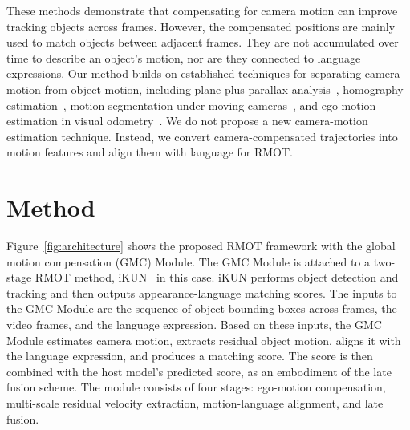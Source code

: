 \documentclass{article}
\begin{document}
These methods demonstrate that compensating for camera motion can improve tracking objects across frames. However, the compensated positions are mainly used to match objects between adjacent frames. They are not accumulated over time to describe an object's motion, nor are they connected to language expressions. Our method builds on established techniques for separating camera motion from object motion, including plane-plus-parallax analysis~\cite{iranianandan}, homography estimation~\cite{hartleyzisserman}, motion segmentation under moving cameras~\cite{bideau}, and ego-motion estimation in visual odometry~\cite{scaramuzza}. We do not propose a new camera-motion estimation technique. Instead, we convert camera-compensated trajectories into motion features and align them with language for RMOT.




\section{Method}
\label{sec:method}
Figure~\ref{fig:architecture} shows the proposed RMOT framework with the global motion compensation (GMC) Module. The GMC Module is attached to a two-stage RMOT method, iKUN~\cite{ikun} in this case. iKUN performs object detection and tracking and then outputs appearance-language matching scores. The inputs to the GMC Module are the sequence of object bounding boxes across frames, the video frames, and the language expression. Based on these inputs, the GMC Module estimates camera motion, extracts residual object motion, aligns it with the language expression, and produces a matching score. The score is then combined with the host model's predicted score, as an embodiment of the late fusion scheme. The module consists of four stages: ego-motion compensation, multi-scale residual velocity extraction, motion-language alignment, and late fusion.
\end{document}
